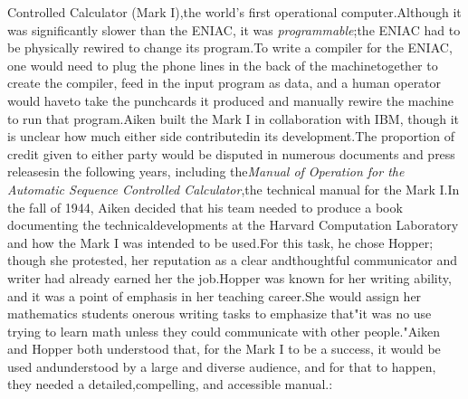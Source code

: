 Controlled Calculator (Mark I),the world's first operational computer.Although
it was significantly slower than the ENIAC, it was \textit{programmable};the
ENIAC had to be physically rewired to change its program.To write a compiler
for the ENIAC, one would need to plug the phone lines in the back of the
machinetogether to create the compiler, feed in the input program as data, and
a human operator would haveto take the punchcards it produced and manually
rewire the machine to run that program.Aiken built the Mark I in collaboration
with IBM, though it is unclear how much either side contributedin its
development.The proportion of credit given to either party would be disputed in
numerous documents and press releasesin the following years, including
the\textit{Manual of Operation for the Automatic Sequence Controlled
    Calculator},the technical manual for the Mark I.In the fall of 1944, Aiken
decided that his team needed to produce a book documenting the
technicaldevelopments at the Harvard Computation Laboratory and how the Mark I
was intended to be used.For this task, he chose Hopper; though she protested,
her reputation as a clear andthoughtful communicator and writer had already
earned her the job.Hopper was known for her writing ability, and it was a point
of emphasis in her teaching career.She would assign her mathematics students
onerous writing tasks to emphasize that"it was no use trying to learn math
unless they could communicate with other people."\cite[interview on 5 July,
    1972]{grace_hopper_and_the_invention_of_the_information_age_2009}Aiken and
Hopper both understood that, for the Mark I to be a success, it would be used
andunderstood by a large and diverse audience, and for that to happen, they
needed a detailed,compelling, and accessible
manual.\cite{annals_of_the_computation_laboratory_of_harvard_university_1946}:%
